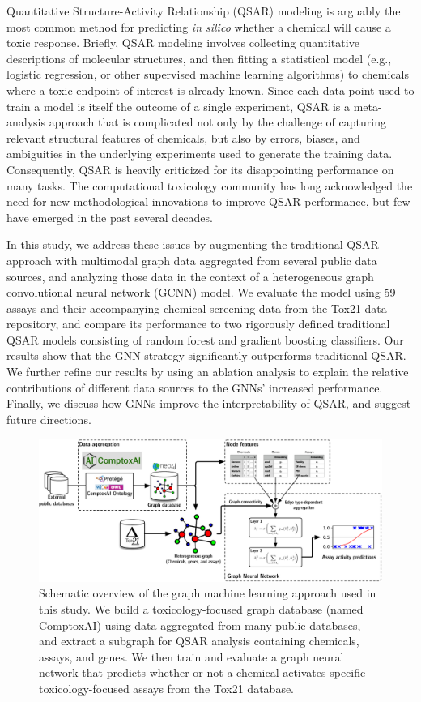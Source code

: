 \documentclass{ws-procs11x85}
\begin{document}
Quantitative Structure-Activity Relationship (QSAR) modeling is arguably the most common method for predicting \textit{in silico} whether a chemical will cause a toxic response.
Briefly, QSAR modeling involves collecting quantitative descriptions of molecular structures, and then fitting a statistical model (e.g., logistic regression, or other supervised machine learning algorithms) to chemicals where a toxic endpoint of interest is already known.
Since each data point used to train a model is itself the outcome of a single experiment, QSAR is a meta-analysis approach that is complicated not only by the challenge of capturing relevant structural features of chemicals, but also by errors, biases, and ambiguities in the underlying experiments used to generate the training data.
Consequently, QSAR is heavily criticized for its disappointing performance on many tasks.
The computational toxicology community has long acknowledged the need for new methodological innovations to improve QSAR performance, but few have emerged in the past several decades.

In this study, we address these issues by augmenting the traditional QSAR approach with multimodal graph data aggregated from several public data sources, and analyzing those data in the context of a heterogeneous graph convolutional neural network (GCNN) model.
We evaluate the model using 59 assays and their accompanying chemical screening data from the Tox21 data repository, and compare its performance to two rigorously defined traditional QSAR models consisting of random forest and gradient boosting classifiers.
Our results show that the GNN strategy significantly outperforms traditional QSAR.
We further refine our results by using an ablation analysis to explain the relative contributions of different data sources to the GNNs' increased performance.
Finally, we discuss how GNNs improve the interpretability of QSAR, and suggest future directions.

\begin{figure}
   \centering
   \includegraphics[width=\textwidth]{figures/figure1.pdf}
   \caption{Schematic overview of the graph machine learning approach used in this study. We build a toxicology-focused graph database (named ComptoxAI) using data aggregated from many public databases, and extract a subgraph for QSAR analysis containing chemicals, assays, and genes. We then train and evaluate a graph neural network that predicts whether or not a chemical activates specific toxicology-focused assays from the Tox21 database.}
\end{figure}
\end{document}
